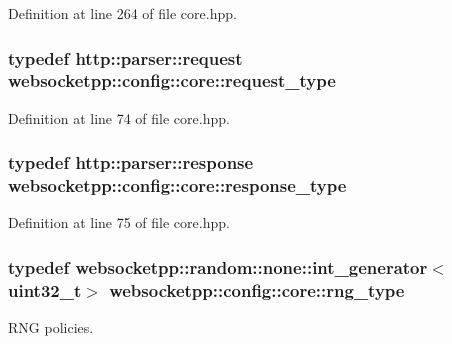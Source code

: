 Definition at line 264 of file core.\+hpp.

\hypertarget{structwebsocketpp_1_1config_1_1core_a6b17eee7cb81f247afc8f3d7b3a3fc9e}{}
\subsubsection[{request\+\_\+type}]{\setlength{\rightskip}{0pt plus 5cm}typedef {\bf http\+::parser\+::request} {\bf websocketpp\+::config\+::core\+::request\+\_\+type}}\label{structwebsocketpp_1_1config_1_1core_a6b17eee7cb81f247afc8f3d7b3a3fc9e}


Definition at line 74 of file core.\+hpp.

\hypertarget{structwebsocketpp_1_1config_1_1core_a08e9a1d498f9002cbabcb1102df6005b}{}
\subsubsection[{response\+\_\+type}]{\setlength{\rightskip}{0pt plus 5cm}typedef {\bf http\+::parser\+::response} {\bf websocketpp\+::config\+::core\+::response\+\_\+type}}\label{structwebsocketpp_1_1config_1_1core_a08e9a1d498f9002cbabcb1102df6005b}


Definition at line 75 of file core.\+hpp.

\hypertarget{structwebsocketpp_1_1config_1_1core_a245db33d05f7994d221db66f506ab8c6}{}
\subsubsection[{rng\+\_\+type}]{\setlength{\rightskip}{0pt plus 5cm}typedef {\bf websocketpp\+::random\+::none\+::int\+\_\+generator}$<$uint32\+\_\+t$>$ {\bf websocketpp\+::config\+::core\+::rng\+\_\+type}}\label{structwebsocketpp_1_1config_1_1core_a245db33d05f7994d221db66f506ab8c6}


R\+N\+G policies. 



